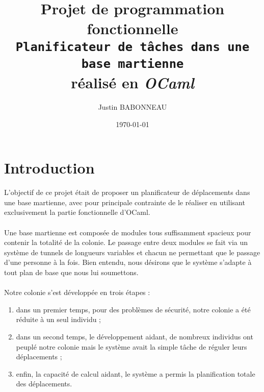 \documentclass[11pt, a4paper, twoside, titlepage]{article}
\begin{document}
\pagestyle{fancy}

\fancyhead{}\fancyfoot{}



\fancyfoot[C]{\thepage}

\title{{\titlefont \textbf{Projet} de programmation fonctionnelle}\\
\texttt{Planificateur de tâches dans une base martienne}\\
réalisé en \textit{OCaml}}
\author{Justin \textsc{BABONNEAU}}
\date{\today} 
\maketitle

\section*{Introduction}

L'objectif de ce projet était de proposer un planificateur de déplacements dans une base martienne, avec pour principale contrainte de le réaliser en utilisant exclusivement la partie fonctionnelle d'OCaml.\\
\\
Une base martienne est composée de modules tous suffisamment spacieux pour contenir la totalité de la colonie. Le passage entre deux modules se fait via un système de tunnels de longueurs variables et chacun ne permettant que le passage d'une personne à la fois. Bien entendu, nous désirons que le système s'adapte à tout plan de base que nous lui soumettons.\\
\\
Notre colonie s'est développée en trois étapes :
\begin{enumerate}
\item dans un premier temps, pour des problèmes de sécurité, notre colonie a été réduite à un seul individu ;
\item dans un second temps, le développement aidant, de nombreux individus ont peuplé notre colonie mais le système avait la simple tâche de réguler leurs déplacements ;
\item enfin, la capacité de calcul aidant, le système a permis la planification totale des déplacements.
\end{enumerate}

\newpage


\tableofcontents
\end{document}
